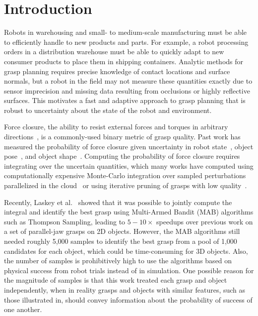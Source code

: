 \section{Introduction}
Robots in warehousing and small- to medium-scale manufacturing must be able to efficiently handle to new products and parts.
For example, a robot processing orders in a distribution warehouse must be able to quickly adapt to new consumer products to place them in shipping containers.
Analytic methods for grasp planning requires precise knowledge of contact locations and surface normals,
but a robot in the field may not measure these quantities exactly due to sensor imprecision and missing data resulting from occlusions or highly reflective surfaces.
This motivates a fast and adaptive approach to grasp planning that is robust to uncertainty about the state of the robot and environment.

Force closure, the ability to resist external forces and torques in arbitrary directions~\cite{li1988task}, is a commonly-used binary metric of grasp quality.
Past work has measured the probability of force closure given uncertainty in robot state~\cite{brook2011collaborative, hsiao2011bayesian}, object pose~\cite{christopoulos2007handling, kim2012physically, weisz2012pose}, and object shape~\cite{brook2011collaborative, hsiao2011bayesian, kehoe2012estimating, mahler2015gp}.
Computing the probability of force closure requires integrating over the uncertain quantities, which many works have computed using computationally expensive Monte-Carlo integration over sampled perturbations~\cite{christopoulos2007handling, hsiao2011bayesian, kehoe2012toward, kim2012physically, weisz2012pose} parallelized in the cloud~\cite{kehoe2012toward} or using iterative pruning of grasps with low quality~\cite{kehoe2012estimating, kehoe2015survey}.

Recently, Laskey et al.~\cite{laskey2015bandits} showed that it was possible to jointly compute the integral and identify the best grasp using Multi-Armed Bandit (MAB) algorithms such as Thompson Sampling, leading to $5-10\times$ speedups over previous work on a set of parallel-jaw grasps on 2D objects.
However, the MAB algorithms still needed roughly 5,000 samples to identify the best grasp from a pool of 1,000 candidates for each object, which could be time-consuming for 3D objects.
Also, the number of samples is prohibitively high to use the algorithms based on physical success from robot trials instead of in simulation.
One possible reason for the magnitude of samples is that this work treated each grasp and object independently, when in reality grasps and objects with similar features, such as those illustrated in, should convey information about the probability of success of one another.

